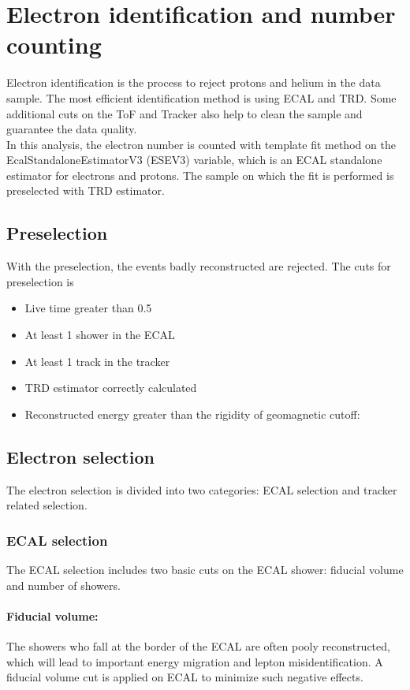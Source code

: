 \section[Electron ID]{Electron identification and number counting}
Electron identification is the process to reject protons and helium in the data sample. The most efficient identification method is using ECAL and TRD. Some additional cuts on the ToF and Tracker also help to clean the sample and guarantee the data quality.\\
In this analysis, the electron number is counted with template fit method on the EcalStandaloneEstimatorV3 (ESEV3) variable, which is an ECAL standalone estimator for electrons and protons. The sample on which the fit is performed is preselected with TRD estimator.

\subsection{Preselection}\label{sec:presel}
With the preselection, the events badly reconstructed are rejected. The cuts for preselection is 
\begin{itemize}
\item Live time greater than 0.5
\item At least 1 shower in the ECAL
\item At least 1 track in the tracker
\item TRD estimator correctly calculated
\item Reconstructed energy greater than the rigidity of geomagnetic cutoff: 
\end{itemize}

\subsection{Electron selection}
The electron selection is divided into two categories: ECAL selection and tracker related selection.
\subsubsection{ECAL selection}
The ECAL selection includes two basic cuts on the ECAL shower: fiducial volume and number of showers.
\paragraph{Fiducial volume:} The showers who fall at the border of the ECAL are often pooly reconstructed, which will lead to important energy migration and lepton misidentification. A fiducial volume cut is applied on ECAL to minimize such negative effects.
